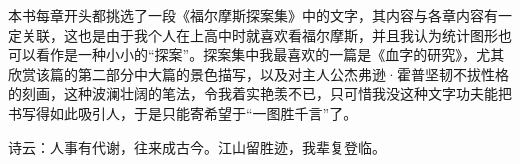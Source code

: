 \documentclass[
  b5paper,
  UTF8,twoside]{book}
\begin{document}
本书每章开头都挑选了一段《福尔摩斯探案集》中的文字，其内容与各章内容有一定关联，这也是由于我个人在上高中时就喜欢看福尔摩斯，并且我认为统计图形也可以看作是一种小小的``探案''。探案集中我最喜欢的一篇是《血字的研究》，尤其欣赏该篇的第二部分中大篇的景色描写，以及对主人公杰弗逊·霍普坚韧不拔性格的刻画，这种波澜壮阔的笔法，令我着实艳羡不已，只可惜我没这种文字功夫能把书写得如此吸引人，于是只能寄希望于``一图胜千言''了。

诗云：人事有代谢，往来成古今。江山留胜迹，我辈复登临。

\backmatter
\printindex


\end{document}
